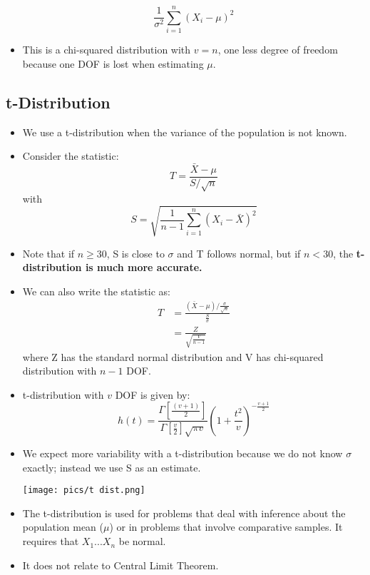 \documentclass[10pt, letterpaper, twoside]{article}
\newenvironment{Figure}
  {\par\medskip\noindent\minipage{\linewidth}}
  {\endminipage\par\medskip}
\begin{document}
\begin{multicols}{2}
\begin{itemize}
    \begin{equation*}
        \frac{1}{\sigma^2}\sum_{i=1}^n(X_i - \mu)^2
    \end{equation*}
    \item This is a chi-squared distribution with $v = n$, one less degree of freedom because one DOF is lost when estimating $\mu$.

\end{itemize}

\subsection{t-Distribution}

\begin{itemize}
    \item We use a t-distribution when the variance of the population is not known.
    \item Consider the statistic:
    \begin{equation*}
        T = \frac{\bar{X} - \mu}{S/\sqrt{n}}
    \end{equation*}
    with
    \begin{equation*}
        S = \sqrt{\frac{1}{n-1}\sum_{i=1}^n(X_i-\bar{X})^2}
    \end{equation*}
    \item Note that if $n \geq 30$, S is close to $\sigma$ and T follows normal, but if $n < 30$, the \textbf{t-distribution is much more accurate.} 
    \item We can also write the statistic as:
    \begin{align*}
        T &= \frac{(\bar{X}-\mu)/\frac{\sigma}{\sqrt{n}}}{\frac{S}{\sigma}}\\
        &= \frac{Z}{\sqrt{\frac{V}{n-1}}}
    \end{align*}
    where Z has the standard normal distribution and V has chi-squared distribution with $n-1$ DOF.
    \item t-distribution with $v$ DOF is given by:
    \begin{equation*}
        h(t) = \frac{\Gamma[\frac{(v+1)}{2}]}{\Gamma[\frac{v}{2}]\sqrt{\pi v}}(1+\frac{t^2}{v})^{-\frac{v+1}{2}}
    \end{equation*}
    \item We expect more variability with a t-distribution because we do not know $\sigma$ exactly; instead we use S as an estimate.
    \begin{Figure}
        \centering
        \texttt{[image: pics/t dist.png]}
    \end{Figure}
    \item The t-distribution is used for problems that deal with inference about the population mean ($\mu$) or in problems that involve comparative samples. It requires that $X_1 ... X_n$ be normal.
    \item It does not relate to Central Limit Theorem.
\end{itemize}


\end{multicols}
\end{document}
